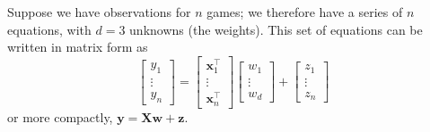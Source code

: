 \documentclass{article}
\begin{document}
\noindent
Suppose we have observations for $n$ games; we therefore have a series of $n$ equations, with $d = 3$ unknowns (the weights). This set of equations can be written in matrix form as $$\begin{bmatrix}y_1 \\ \vdots \\ y_n\end{bmatrix} = \begin{bmatrix}\mathbf{x}_1^{\top} \\ \vdots \\ \mathbf{x}_n^{\top}\end{bmatrix}\begin{bmatrix}w_1 \\ \vdots \\ w_d\end{bmatrix} + \begin{bmatrix}z_1 \\ \vdots \\ z_n\end{bmatrix}$$ or more compactly, $\mathbf{y} = \mathbf{X}\mathbf{w} + \mathbf{z}$. \\
\end{document}
